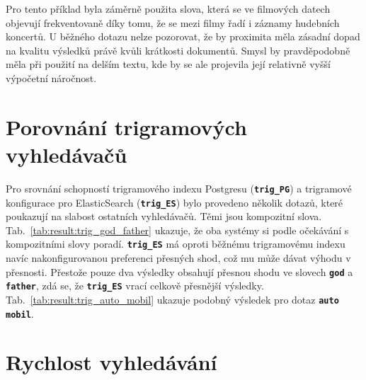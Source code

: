 \documentclass[11pt,letterpaper,oneside,openright]{book}
\newcommand{\bftt}[1]{\texttt{\textbf{#1}}}
\begin{document}
Pro tento příklad byla záměrně použita slova, která se ve filmových datech
objevují frekventovaně díky tomu, že se mezi filmy řadí i záznamy hudebních
koncertů. U běžného dotazu nelze pozorovat, že by proximita měla zásadní dopad
na kvalitu výsledků právě kvůli krátkosti dokumentů. Smysl by pravděpodobně
měla při použití na delším textu, kde by se ale projevila její relativně vyšší
výpočetní náročnost.


\mbox{}\mbox{}

\mbox{}\mbox{}


\section{Porovnání trigramových vyhledávačů}
Pro srovnání schopností trigramového indexu Postgresu (\bftt{trig\_PG})
a trigramové konfigurace pro ElasticSearch (\bftt{trig\_ES}) bylo
provedeno několik dotazů, které poukazují na slabost ostatních
vyhledávačů. Těmi jsou kompozitní slova.
Tab.~\ref{tab:result:trig_god_father} ukazuje, že oba systémy si podle
očekávání s kompozitními slovy poradí. \bftt{trig\_ES} má oproti běžnému
trigramovému indexu navíc nakonfigurovanou preferenci přesných shod, což
mu může dávat výhodu v přesnosti. Přestože pouze dva výsledky obsahují
přesnou shodu ve slovech \bftt{god} a \bftt{father}, zdá se, že
\bftt{trig\_ES} vrací celkově přesnější výsledky.
Tab.~\ref{tab:result:trig_auto_mobil} ukazuje podobný výsledek pro dotaz
\bftt{auto mobil}.

\mbox{}\mbox{}

\mbox{}\mbox{}



\clearpage
\section{Rychlost vyhledávání} \label{sec:rychlost_vyhledavani}

\end{document}
